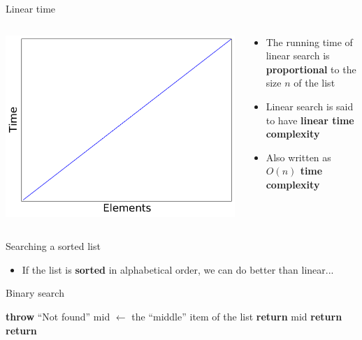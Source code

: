 \begin{frame}{Linear time}
	\begin{columns}
		\begin{column}{0.45\textwidth}
			\includegraphics[width=\textwidth]{plot2_linear}
		\end{column}
		\begin{column}{0.55\textwidth}
			\begin{itemize}
				\item The running time of linear search is \textbf{proportional} to the size $n$ of the list \pause
				\item Linear search is said to have \textbf{linear time complexity} \pause
				\item Also written as \textbf{$O(n)$ time complexity}
			\end{itemize}
		\end{column}
	\end{columns}
\end{frame}

\begin{frame}{Searching a sorted list}
			\begin{itemize}
				\item If the list is \textbf{sorted} in alphabetical order, we can do better than linear...
			\end{itemize}
\end{frame}

\begin{frame}{Binary search}
	\begin{algorithmic}
		 \pause
				\State \textbf{throw} ``Not found''
			\EndIf \pause
			\State mid $\gets$ the ``middle'' item of the list \pause
				\State \textbf{return} mid \pause
				\State \textbf{return}  \pause
				\State \textbf{return}  \pause
			\EndIf
		\EndProcedure
	\end{algorithmic}
\end{frame}

